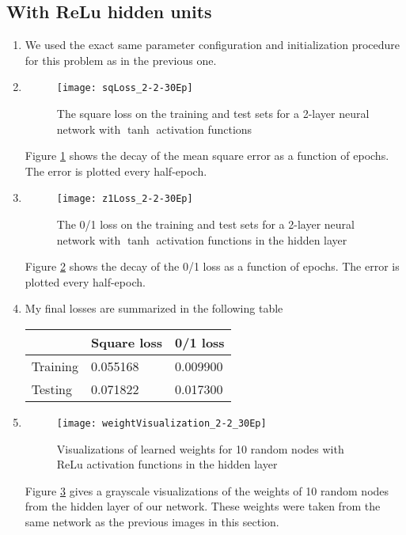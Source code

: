 \documentclass{article}
\begin{document}
\subsection{With ReLu hidden units}
\begin{enumerate}
    \item We used the exact same parameter configuration and initialization procedure for this problem as in the previous one.
    \item
    \begin{figure}
        \centering
        \texttt{[image: sqLoss\_2-2-30Ep]}
        \caption{The square loss on the training and test sets for a 2-layer neural network with $\tanh$ activation functions} 
        \label{fig:sqLoss_2-2}
    \end{figure}
    Figure \ref{fig:sqLoss_2-2} shows the decay of the mean square error as a function of epochs. The error is plotted every half-epoch.
    \item
    \begin{figure}
        \centering
        \texttt{[image: z1Loss\_2-2-30Ep]}
        \caption{The 0/1 loss on the training and test sets for a 2-layer neural network with $\tanh$ activation functions in the hidden layer} 
        \label{fig:z1Loss_2-2}
    \end{figure}
    Figure \ref{fig:z1Loss_2-2} shows the decay of the 0/1 loss as a function of epochs. The error is plotted every half-epoch.
    \item My final losses are summarized in the following table

    \begin{tabular}{l|ll}
    & Square loss & 0/1 loss \\
    \hline
    Training & 0.055168  & 0.009900 \\
    Testing  & 0.071822  & 0.017300
    \end{tabular}

    \item 
    \begin{figure}
        \centering
        \texttt{[image: weightVisualization\_2-2\_30Ep]}
        \caption{Visualizations of learned weights for 10 random nodes with ReLu activation functions in the hidden layer} 
        \label{fig:weights2-2}
    \end{figure}
    Figure \ref{fig:weights2-2} gives a grayscale visualizations of the weights of 10 random nodes from the hidden layer of our network. These weights were taken from the same network as the previous images in this section.
\end{enumerate}
\end{document}
